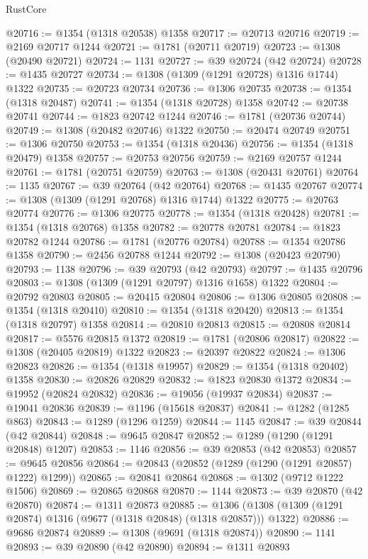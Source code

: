 \begin{lexlean}{RustCore}
\begin{coremodule}
@20716 := @1354 (@1318 @20538) @1358
@20717 := @20713 @20716
@20719 := @2169 @20717 @1244
@20721 := @1781 (@20711 @20719)
@20723 := @1308 (@20490 @20721)
@20724 := 1131
@20727 := @39 @20724 (@42 @20724)
@20728 := @1435 @20727
@20734 := @1308 (@1309 (@1291 @20728) @1316 @1744) @1322
@20735 := @20723 @20734
@20736 := @1306 @20735
@20738 := @1354 (@1318 @20487)
@20741 := @1354 (@1318 @20728) @1358
@20742 := @20738 @20741
@20744 := @1823 @20742 @1244
@20746 := @1781 (@20736 @20744)
@20749 := @1308 (@20482 @20746) @1322
@20750 := @20474 @20749
@20751 := @1306 @20750
@20753 := @1354 (@1318 @20436)
@20756 := @1354 (@1318 @20479) @1358
@20757 := @20753 @20756
@20759 := @2169 @20757 @1244
@20761 := @1781 (@20751 @20759)
@20763 := @1308 (@20431 @20761)
@20764 := 1135
@20767 := @39 @20764 (@42 @20764)
@20768 := @1435 @20767
@20774 := @1308 (@1309 (@1291 @20768) @1316 @1744) @1322
@20775 := @20763 @20774
@20776 := @1306 @20775
@20778 := @1354 (@1318 @20428)
@20781 := @1354 (@1318 @20768) @1358
@20782 := @20778 @20781
@20784 := @1823 @20782 @1244
@20786 := @1781 (@20776 @20784)
@20788 := @1354 @20786 @1358
@20790 := @2456 @20788 @1244
@20792 := @1308 (@20423 @20790)
@20793 := 1138
@20796 := @39 @20793 (@42 @20793)
@20797 := @1435 @20796
@20803 := @1308 (@1309 (@1291 @20797) @1316 @1658) @1322
@20804 := @20792 @20803
@20805 := @20415 @20804
@20806 := @1306 @20805
@20808 := @1354 (@1318 @20410)
@20810 := @1354 (@1318 @20420)
@20813 := @1354 (@1318 @20797) @1358
@20814 := @20810 @20813
@20815 := @20808 @20814
@20817 := @5576 @20815 @1372
@20819 := @1781 (@20806 @20817)
@20822 := @1308 (@20405 @20819) @1322
@20823 := @20397 @20822
@20824 := @1306 @20823
@20826 := @1354 (@1318 @19957)
@20829 := @1354 (@1318 @20402) @1358
@20830 := @20826 @20829
@20832 := @1823 @20830 @1372
@20834 := @19952 (@20824 @20832)
@20836 := @19056 (@19937 @20834)
@20837 := @19041 @20836
@20839 := @1196 (@15618 @20837)
@20841 := @1282 (@1285 @863)
@20843 := @1289 (@1296 @1259)
@20844 := 1145
@20847 := @39 @20844 (@42 @20844)
@20848 := @9645 @20847
@20852 := @1289 (@1290 (@1291 @20848) @1207)
@20853 := 1146
@20856 := @39 @20853 (@42 @20853)
@20857 := @9645 @20856
@20864 := @20843 (@20852 (@1289 (@1290 (@1291 @20857) @1222) @1299))
@20865 := @20841 @20864
@20868 := @1302 (@9712 @1222 @1506)
@20869 := @20865 @20868
@20870 := 1144
@20873 := @39 @20870 (@42 @20870)
@20874 := @1311 @20873
@20885 := @1306 (@1308 (@1309 (@1291 @20874) @1316 (@9677 (@1318 @20848) (@1318 @20857))) @1322)
@20886 := @9686 @20874
@20889 := @1308 (@9691 (@1318 @20874))
@20890 := 1141
@20893 := @39 @20890 (@42 @20890)
@20894 := @1311 @20893

\end{coremodule}
\end{lexlean}
